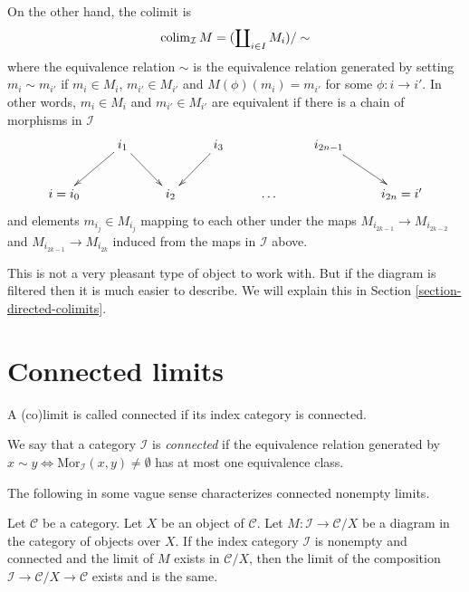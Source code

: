 \medskip\noindent
On the other hand, the colimit is
$$
\mathop{\rm colim}\nolimits_{\mathcal{I}} M
=
(\coprod\nolimits_{i\in I} M_i)/\sim
$$
where the equivalence relation $\sim$ is the equivalence relation
generated by setting $m_i \sim m_{i'}$ if $m_i \in M_i$,
$m_{i'} \in M_{i'}$ and $M(\phi)(m_i) = m_{i'}$ for some
$\phi : i \to i'$. In other words, $m_i \in M_i$
and $m_{i'} \in M_{i'}$ are equivalent if there is a
chain of morphisms in $\mathcal{I}$
$$
\xymatrix{
&
i_1 \ar[ld] \ar[rd]
&
&
i_3 \ar[ld]
&
&
i_{2n-1} \ar[rd]
&
\\
i = i_0
&
&
i_2
&
&
\ldots
&
&
i_{2n} = i'
}
$$
and elements $m_{i_j} \in M_{i_j}$ mapping to each other under
the maps $M_{i_{2k-1}} \to M_{i_{2k-2}}$ and $M_{i_{2k-1}}
\to M_{i_{2k}}$ induced from the maps in $\mathcal{I}$ above.

\medskip\noindent
This is not a very pleasant type of object to work with.
But if the diagram is filtered then it is much easier to
describe. We will explain this in Section \ref{section-directed-colimits}.



\section{Connected limits}
\label{section-connected-limits}

\noindent
A (co)limit is called connected if its index category is connected.

\begin{definition}
\label{definition-category-connected}
We say that a category $\mathcal{I}$ is {\it connected}
if the equivalence relation generated by
$x \sim y \Leftrightarrow \text{Mor}_\mathcal{I}(x, y) \not = \emptyset$
has at most one equivalence class.
\end{definition}

\noindent
The following in some vague sense characterizes connected nonempty limits.

\begin{lemma}
\label{lemma-connected-limit-over-X}
Let $\mathcal{C}$ be a category.
Let $X$ be an object of $\mathcal{C}$.
Let $M : \mathcal{I} \to \mathcal{C}/X$ be a diagram
in the category of objects over $X$.
If the index category $\mathcal{I}$ is nonempty and connected
and the limit of $M$ exists in $\mathcal{C}/X$,
then the limit of the composition
$\mathcal{I} \to \mathcal{C}/X \to \mathcal{C}$
exists and is the same.
\end{lemma}

